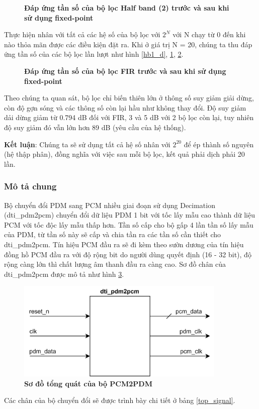 \begin{figure}[H]
    \centering
    
    \caption[Đáp ứng tần số của bộ lọc Half band (2) trước và sau khi sử dụng fixed-point]{\bfseries \fontsize{12pt}{0pt}\selectfont Đáp ứng tần số của bộ lọc Half band (2) trước và sau khi sử dụng fixed-point}
    \label{hb2_d}
\end{figure}
Thực hiện nhân với tất cả các hệ số của bộ lọc với $2^N$ với N chạy từ 0 đến khi nào thỏa mãn được các điều kiện đặt ra. Khi ở giá trị N = 20, chúng ta thu đáp ứng tần số của các bộ lọc lần lượt như hình \ref{hb1_d}, \ref{hb2_d}, \ref{fir_d}.
\begin{figure}[H]
    \centering
    
    \caption[Đáp ứng tần số của bộ lọc FIR trước và sau khi sử dụng fixed-point]{\bfseries \fontsize{12pt}{0pt}\selectfont Đáp ứng tần số của bộ lọc FIR trước và sau khi sử dụng fixed-point}
    \label{fir_d}
\end{figure}
Theo chúng ta quan sát, bộ lọc chỉ biến thiên lớn ở thông số suy giảm giải dừng, còn độ gợn sóng và các thông số còn lại hầu như không thay đổi. Độ suy giảm dải dừng giảm từ 0.794 dB đối với FIR, 3 và 5 dB với 2 bộ lọc còn lại, tuy nhiên độ suy giảm đó vẫn lớn hơn 89 dB (yêu cầu của hệ thống).

\textbf{Kết luận}: Chúng ta sẽ sử dụng tất cả hệ số nhân với $2^20$ để ép thành số nguyên (hệ thập phân), đồng nghĩa với việc sau mỗi bộ lọc, kết quả phải dịch phải 20 lần.
\subsubsection{Mô tả chung}
Bộ chuyển đổi PDM sang PCM nhiều giai đoạn sử dụng Decimation (dti\_pdm2pcm) chuyển đổi dữ liệu PDM 1 bit với tốc lấy mẫu cao thành dữ liệu PCM với  tốc độc lấy mẫu thấp hơn. Tần số cấp cho bộ gấp 4 lần tần số lấy mẫu của PDM, từ tần số này sẽ cấp và chia tần ra các tần số cần thiết cho dti\_pdm2pcm. Tín hiệu PCM đầu ra sẽ đi kèm theo sườn dương của tín hiệu đồng hồ PCM đầu ra với độ rộng bit do người dùng quyết định (16 - 32 bit), độ rộng càng lớn thì chất lượng âm thanh đầu ra càng cao. Sơ đồ chân của dti\_pdm2pcm được mô tả như hình \ref{top_pdm2pcm}.

\begin{figure}[H]
    \centering
    \includegraphics[width=10cm]{Images/Chuong4/top.png}
    \caption[Sơ đồ tổng quát của bộ PCM2PDM]{\bfseries \fontsize{12pt}{0pt}\selectfont Sơ đồ tổng quát của bộ PCM2PDM}
    \label{top_pdm2pcm}
\end{figure}
Các chân của bộ chuyển đổi sẽ được trình bày chi tiết ở bảng \ref{top_signal}.

